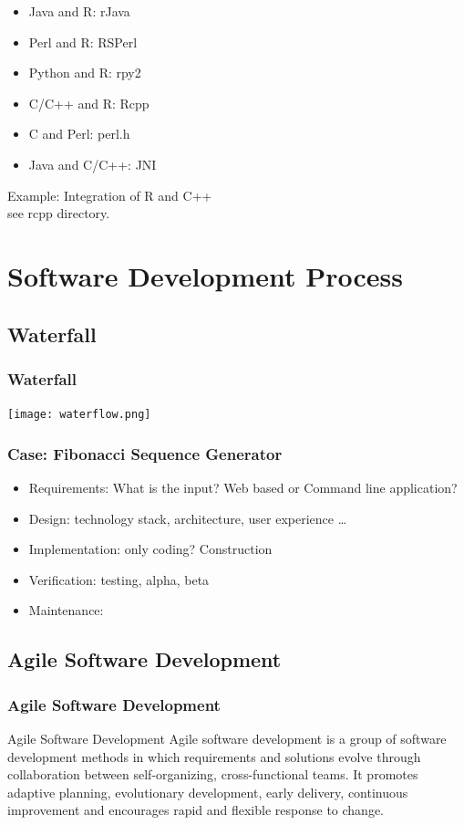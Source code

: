 \documentclass[UTF8]{beamer}
\begin{document}
\begin{frame}
  \begin{itemize}
    \item Java and R: rJava
    \item Perl and R: RSPerl
    \item Python and R: rpy2
    \item C/C++ and R: Rcpp
    \item C and Perl: perl.h
    \item Java and C/C++: JNI
  \end{itemize}
\end{frame}

\begin{frame}
  Example: Integration of R and C++\\
  see rcpp directory.
\end{frame}


\section{Software Development Process}

\subsection{Waterfall}
\begin{frame}
  \frametitle{Waterfall}
  \centerline{\texttt{[image: waterflow.png]}}
\end{frame}

\begin{frame}
  \frametitle{Case: Fibonacci Sequence Generator}
  \begin{itemize}
    \item Requirements: What is the input? Web based or Command line application?
    \item Design: technology stack, architecture, user experience \ldots
    \item Implementation: only coding? Construction
    \item Verification: testing, alpha, beta
    \item Maintenance:
  \end{itemize}
\end{frame}

\subsection{Agile Software Development}

\begin{frame}
  \frametitle{Agile Software Development}
  \begin{block}{Agile Software Development}
    Agile software development is a group of software development methods in which requirements and
    solutions evolve through collaboration between self-organizing, cross-functional teams. It
    promotes adaptive planning, evolutionary development, early delivery, continuous improvement
    and encourages rapid and flexible response to change.
  \end{block}
\end{frame}
\end{document}
